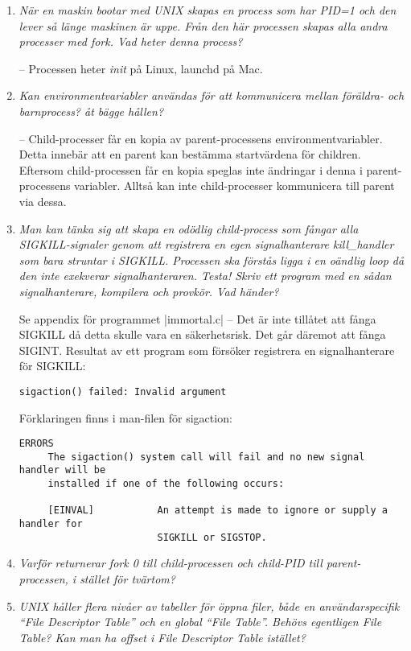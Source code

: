 \documentclass[paper=a4, fontsize=11pt]{scrartcl} %
\numberwithin{equation}{section} %
\numberwithin{figure}{section} %
\numberwithin{table}{section} %
\begin{document}
\begin{enumerate}[1)]
\item \emph{När en maskin bootar med UNIX skapas en process som har PID=1 och den lever så länge maskinen är uppe. Från den här processen skapas alla andra processer med fork. Vad heter denna process?}

-- Processen heter \emph{init} på Linux, launchd på Mac.

\item \emph{Kan environmentvariabler användas för att kommunicera mellan föräldra- och barnprocess? åt bägge hållen?}

-- Child-processer får en kopia av parent-processens environmentvariabler. Detta innebär att en parent kan bestämma startvärdena för children.
Eftersom child-processen får en kopia speglas inte ändringar i denna i parent-processens variabler. Alltså kan inte child-processer kommunicera till parent via dessa.

\item \emph{Man kan tänka sig att skapa en odödlig child-process som fångar alla SIGKILL-signaler genom att registrera en egen signalhanterare kill\_handler som bara struntar i SIGKILL. Processen ska förstås ligga i en oändlig loop då den inte exekverar signalhanteraren. Testa! Skriv ett program med en sådan signalhanterare, kompilera och provkör. Vad händer?}

Se appendix för programmet |immortal.c|
-- Det är inte tillåtet att fånga SIGKILL då detta skulle vara en säkerhetsrisk. Det går däremot att fånga SIGINT.
Resultat av ett program som försöker registrera en signalhanterare för SIGKILL:

\begin{verbatim}
sigaction() failed: Invalid argument
\end{verbatim}

Förklaringen finns i man-filen för sigaction:
\begin{verbatim}
ERRORS
     The sigaction() system call will fail and no new signal handler will be
     installed if one of the following occurs:

     [EINVAL]           An attempt is made to ignore or supply a handler for
                        SIGKILL or SIGSTOP.
\end{verbatim}

\item \emph{Varför returnerar fork 0 till child-processen och child-PID till parent-processen, i stället för tvärtom?}


\item \emph{UNIX håller flera nivåer av tabeller för öppna filer, både en användarspecifik “File Descriptor Table” och en global “File Table”. Behövs egentligen File Table? Kan man ha offset i File Descriptor Table istället?}



\end{enumerate}
\end{document}
